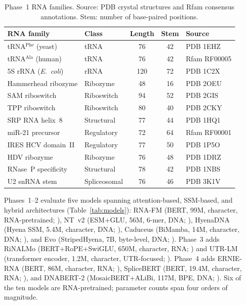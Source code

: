 \documentclass[11pt]{article}
\begin{document}
\begin{table}[t]
\centering
\caption{Phase~1 RNA families.  Source: PDB crystal structures and
  Rfam consensus annotations.  Stem: number of base-paired positions.}
\label{tab:rna_families}
\small
\begin{tabular}{@{}llccl@{}}
\toprule
\textbf{RNA family} & \textbf{Class} & \textbf{Length} &
  \textbf{Stem} & \textbf{Source} \\
\midrule
tRNA$^{\mathrm{Phe}}$ (yeast)  & tRNA         & 76  & 42 & PDB 1EHZ \\
tRNA$^{\mathrm{Ala}}$ (human)  & tRNA         & 76  & 42 & Rfam RF00005 \\
5S rRNA (\textit{E.\ coli})    & rRNA         & 120 & 72 & PDB 1C2X \\
Hammerhead ribozyme             & Ribozyme     & 48  & 16 & PDB 2OEU \\
SAM riboswitch                  & Riboswitch   & 94  & 52 & PDB 2GIS \\
TPP riboswitch                  & Riboswitch   & 80  & 40 & PDB 2CKY \\
SRP RNA helix~8                 & Structural   & 77  & 44 & PDB 1HQ1 \\
miR-21 precursor                & Regulatory   & 72  & 64 & Rfam RF00001 \\
IRES HCV domain~II              & Regulatory   & 77  & 50 & PDB 1P5O \\
HDV ribozyme                    & Ribozyme     & 76  & 48 & PDB 1DRZ \\
RNase~P specificity             & Structural   & 78  & 42 & PDB 1NBS \\
U2 snRNA stem                   & Spliceosomal & 76  & 46 & PDB 3K1V \\
\bottomrule
\end{tabular}
\end{table}

Phases~1--2 evaluate five models spanning attention-based, SSM-based,
and hybrid architectures (Table~\ref{tab:models}): RNA-FM (BERT, 99M,
character, RNA-pretrained; \citealp{rnafm}), NT~v2 (ESM+GLU, 56M,
6-mer, DNA; \citealp{dalla2023nucleotide}), HyenaDNA (Hyena SSM,
5.4M, character, DNA; \citealp{nguyen2024hyenadna}), Caduceus
(BiMamba, 14M, character, DNA; \citealp{schiff2024caduceus}), and Evo
(StripedHyena, 7B, byte-level, DNA; \citealp{nguyen2024evo}).
Phase~3 adds RiNALMo (BERT+RoPE+SwiGLU, 650M, character, RNA;
\citealp{penic2024rinalmo}) and UTR-LM (transformer encoder, 1.2M,
character, UTR-focused; \citealp{chu2024utrlm}).
Phase~4 adds ERNIE-RNA (BERT, 86M, character, RNA;
\citealp{wang2024ernierna}), SpliceBERT (BERT, 19.4M, character, RNA;
\citealp{chen2024splicebert}), and DNABERT-2 (MosaicBERT+ALiBi, 117M,
BPE, DNA; \citealp{zhou2024dnabert2}).  Six of the ten models are
RNA-pretrained; parameter counts span four orders of magnitude.
\end{document}
